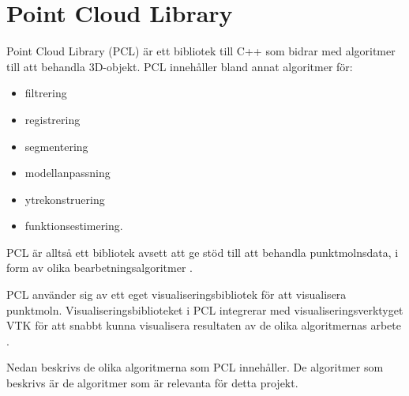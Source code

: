 \section{Point Cloud Library}

Point Cloud Library (PCL) är ett bibliotek till C++ som bidrar med algoritmer till att behandla 3D-objekt. PCL innehåller bland annat algoritmer för:

\begin{itemize}
	\item filtrering
	\item registrering
	\item segmentering
	\item modellanpassning
	\item ytrekonstruering
	\item funktionsestimering.
\end{itemize}
PCL är alltså ett bibliotek avsett att ge stöd till att behandla punktmolnsdata, i form av olika bearbetningsalgoritmer \cite{rusu20113d}.

PCL använder sig av ett eget visualiseringsbibliotek för att visualisera punktmoln. Visualiseringsbiblioteket i PCL integrerar med visualiseringsverktyget VTK \cite{VTK_book} för att snabbt kunna visualisera resultaten av de olika algoritmernas arbete \cite{rusu20113d}.

Nedan beskrivs de olika algoritmerna som PCL innehåller. De algoritmer som beskrivs är de algoritmer som är relevanta för detta projekt.


%
%

